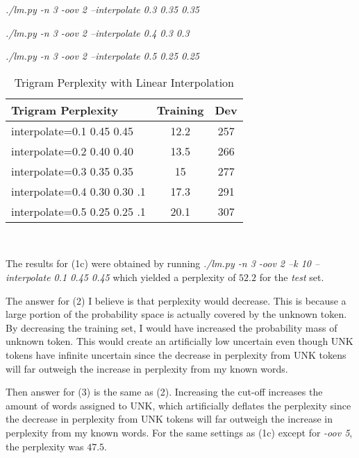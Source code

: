 \documentclass[11pt]{article}
\begin{document}
\textit{./lm.py -n 3 -oov 2 --interpolate 0.3 0.35 0.35}

\textit{./lm.py -n 3 -oov 2 --interpolate 0.4 0.3 0.3}

\textit{./lm.py -n 3 -oov 2 --interpolate 0.5 0.25 0.25}

\FloatBarrier

\begin{table}
	\begin{center}
		\begin{tabular}{l|c|c|}
		\textbf{Trigram Perplexity} & \textbf{Training} & \textbf{Dev} \\
		\hline
		interpolate=0.1 0.45 0.45 & 12.2 & 257  \\
		interpolate=0.2 0.40 0.40  & 13.5 & 266  \\
		interpolate=0.3 0.35 0.35  & 15 & 277  \\
		interpolate=0.4 0.30 0.30 .1 & 17.3 & 291\\
		interpolate=0.5 0.25 0.25 .1 & 20.1 & 307\\
		\end{tabular}\
		\caption{Trigram Perplexity with Linear Interpolation}
		\label{tbl:interpolation}
	\end{center}
\end{table}

\FloatBarrier

The results for (1c) were obtained by running \textit{./lm.py -n 3 -oov 2 --k 10 --interpolate 0.1 0.45 0.45} which yielded a perplexity of $52.2$ for the \textit{test} set.

\bigskip

The answer for (2) I believe is that perplexity would decrease. This is because a large portion of the probability space is actually covered by the unknown token. By decreasing the training set, I would have increased the probability mass of unknown token. This would create an artificially low uncertain even though UNK tokens have infinite uncertain since the decrease in perplexity from UNK tokens will far outweigh the increase in perplexity from my known words.

\bigskip

Then answer for (3) is the same as (2). Increasing the cut-off increases the amount of words assigned to UNK, which artificially deflates the perplexity since the decrease in perplexity from UNK tokens will far outweigh the increase in perplexity from my known words. For the same settings as (1c) except for \textit{-oov 5}, the perplexity was $47.5$.



\end{document}
